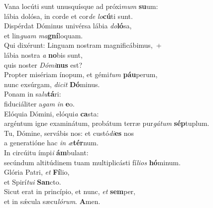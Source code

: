 \evenverse Vana locúti sunt unusquísque ad próxi\textit{mum} \textbf{su}um:~\*\\
\evenverse lábia dolósa, in corde et cor\textit{de} \textit{lo}\textbf{cú}ti sunt.\\
\oddverse Dispérdat Dóminus univérsa lábia \textit{do}\textbf{ló}sa,~\*\\
\oddverse et lin\textit{guam} \textit{ma}\textbf{gní}loquam.\\
\evenverse Qui dixérunt: Linguam nostram magnificábimus,~+\\
\evenverse  lábia nostra \textit{a} \textbf{no}bis sunt,~\*\\
\evenverse quis noster \textit{Dó}\textit{mi}\textbf{nus} est?\\
\oddverse Propter misériam ínopum, et gémi\textit{tum} \textbf{páu}perum,~\*\\
\oddverse nunc exsúrgam, \textit{di}\textit{cit} \textbf{Dó}minus.\\
\evenverse Ponam in sa\textit{lu}\textbf{tá}ri:~\*\\
\evenverse fiduciáliter a\textit{gam} \textit{in} \textbf{e}o.\\
\oddverse Elóquia Dómini, elóqui\textit{a} \textbf{ca}sta:~\*\\
\oddverse argéntum igne examinátum, probátum terræ pur\textit{gá}\textit{tum} \textbf{sép}tuplum.\\
\evenverse Tu, Dómine, servábis nos: et custó\textit{di}\textbf{es} nos~\*\\
\evenverse a generatióne hac \textit{in} \textit{æ}\textbf{tér}num.\\
\oddverse In circúitu ímpi\textit{i} \textbf{ám}bulant:~\*\\
\oddverse secúndum altitúdinem tuam multiplicásti fí\textit{li}\textit{os} \textbf{hó}minum.\\
\evenverse Glória Patri, \textit{et} \textbf{Fí}lio,~\*\\
\evenverse et Spirí\textit{tu}\textit{i} \textbf{San}cto.\\
\oddverse Sicut erat in princípio, et nunc, \textit{et} \textbf{sem}per,~\*\\
\oddverse et in sǽcula sæcu\textit{ló}\textit{rum}. \textbf{A}men.\\

